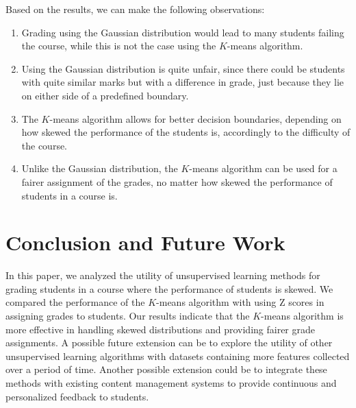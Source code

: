 \documentclass[conference]{IEEEtran}
\begin{document}
Based on the results, we can make the following observations:
\begin{enumerate}
    \item Grading using the Gaussian distribution would lead to many students
    failing the course, while this is not the case using the $K$-means
    algorithm.
    \item Using the Gaussian distribution is quite unfair, since there could
    be students with quite similar marks but with a difference in grade, just
    because they lie on either side of a predefined boundary.
    \item The $K$-means algorithm allows for better decision boundaries,
    depending on how skewed the performance of the students is, accordingly
    to the difficulty of the course.
    \item Unlike the Gaussian distribution, the $K$-means algorithm can be
    used for a fairer assignment of the grades, no matter how skewed the 
    performance of students in a course is.
\end{enumerate}

\section{Conclusion and Future Work}
\label{sec:conclusion}

In this paper, we analyzed the utility of unsupervised learning methods for
grading students in a course where the performance of students is skewed. We
compared the performance of the $K$-means algorithm with using Z scores in
assigning grades to students. Our results indicate that the $K$-means algorithm
is more effective in handling skewed distributions and providing fairer grade
assignments. A possible future extension can be to explore the utility of other
unsupervised learning algorithms with datasets containing more features
collected over a period of time. Another possible extension could be to
integrate these methods with existing content management systems to provide
continuous and personalized feedback to students.



\end{document}
